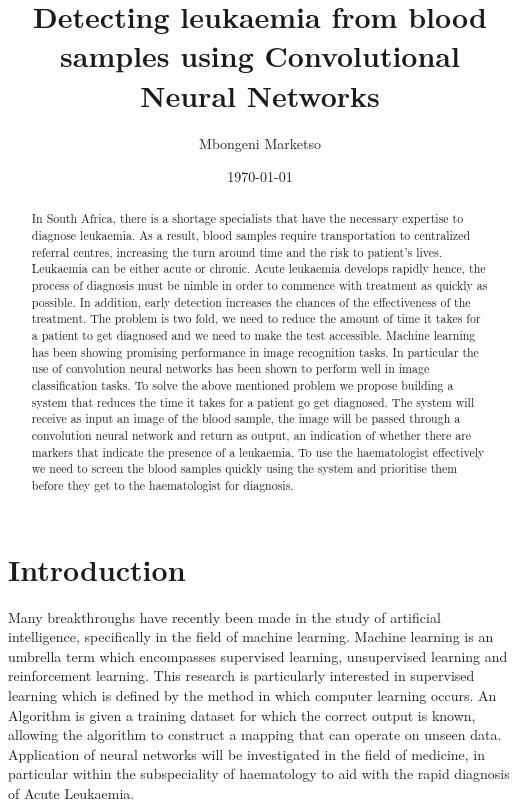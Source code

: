 \documentclass[a4paper,11pt]{article}
\begin{document}
\title{Detecting leukaemia from blood samples using Convolutional Neural Networks}
\author{Mbongeni Marketso \n}
\date{\today}





\begin{abstract}
 In South Africa, there is a shortage specialists that have the necessary expertise to diagnose leukaemia. As a result, blood samples require transportation to centralized referral centres, increasing the turn around time and the risk to patient's lives. Leukaemia can be either acute or chronic. Acute leukaemia develops rapidly hence, the process of diagnosis must be nimble in order to commence with treatment as quickly as possible. In addition, early detection increases the chances of the effectiveness of the treatment. The problem is two fold, we need to reduce  the amount of time it takes for a patient to get diagnosed and we need to make the test accessible. Machine learning has been showing promising performance in image recognition tasks. In particular the use of convolution neural networks has been shown to perform well in image classification tasks. To solve the above mentioned problem we propose building a system that reduces the time it takes for a patient go get diagnosed. The system will receive as input an image of the blood sample, the image will be passed through a convolution neural network and return as output, an indication of whether there are markers that indicate the presence of a leukaemia. To use the haematologist effectively we need to screen the blood samples quickly using the system and prioritise them before they get to the haematologist for diagnosis. 
\end{abstract}
\newpage

\tableofcontents

\newpage

\section{Introduction}
Many breakthroughs have recently been made in the study of artificial intelligence, specifically in the field of machine learning. Machine learning is an umbrella term which encompasses supervised learning, unsupervised learning and reinforcement learning.  This research is particularly interested in supervised learning which is defined by the method in which computer learning occurs. An Algorithm is given a training dataset for which the correct output is known, allowing the algorithm to construct a mapping that can operate on unseen data. Application of neural networks will be investigated in the field of medicine, in particular within the subspeciality of haematology to aid  with the rapid diagnosis of Acute Leukaemia. 
\end{document}
